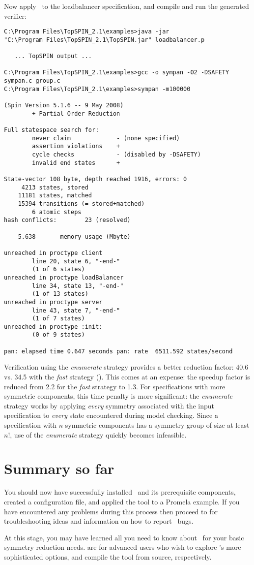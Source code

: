 Now apply \topspin\ to the loadbalancer specification, and compile
and run the generated verifier:
%
\begin{lstlisting}
C:\Program Files\TopSPIN_2.1\examples>java -jar
"C:\Program Files\TopSPIN_2.1\TopSPIN.jar" loadbalancer.p

   ... TopSPIN output ...

C:\Program Files\TopSPIN_2.1\examples>gcc -o sympan -O2 -DSAFETY sympan.c group.c
C:\Program Files\TopSPIN_2.1\examples>sympan -m100000

(Spin Version 5.1.6 -- 9 May 2008)
        + Partial Order Reduction

Full statespace search for:
        never claim             - (none specified)
        assertion violations    +
        cycle checks            - (disabled by -DSAFETY)
        invalid end states      +

State-vector 108 byte, depth reached 1916, errors: 0
     4213 states, stored
    11181 states, matched
    15394 transitions (= stored+matched)
        6 atomic steps
hash conflicts:        23 (resolved)

    5.638       memory usage (Mbyte)

unreached in proctype client
        line 20, state 6, "-end-"
        (1 of 6 states)
unreached in proctype loadBalancer
        line 34, state 13, "-end-"
        (1 of 13 states)
unreached in proctype server
        line 43, state 7, "-end-"
        (1 of 7 states)
unreached in proctype :init:
        (0 of 9 states)

pan: elapsed time 0.647 seconds pan: rate  6511.592 states/second
\end{lstlisting}
%
Verification using the \emph{enumerate} strategy provides a better
reduction factor: 40.6 vs. 34.5 with the \emph{fast} strategy
(). This comes at an expense: the speedup
factor is reduced from 2.2 for the \emph{fast} strategy to 1.3.  For
specifications with more symmetric components, this time penalty is
more significant: the \emph{enumerate} strategy works by applying
\emph{every} symmetry associated with the input specification to
\emph{every} state encountered during model checking.  Since a
specification with $n$ symmetric components has a symmetry group of
size at least $n!$, use of the \emph{enumerate} strategy quickly
becomes infeasible.

\section{Summary so far}
%
You should now have successfully installed \topspin\ and its
prerequisite components, created a configuration file, and applied
the tool to a Promela example.  If you have encountered any problems
during this process then proceed to  for
troubleshooting ideas and information on how to report \topspin\
bugs.

At this stage, you may have learned all you need to know about
\topspin\ for your basic symmetry reduction needs.
 are for advanced users who
wish to explore \topspin's more sophisticated options, and compile
the tool from source, respectively.
